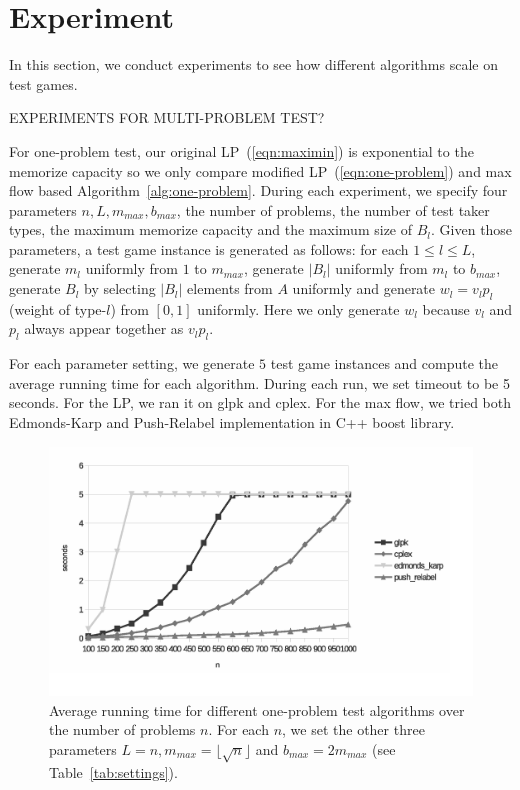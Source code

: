 \documentclass{article}
\begin{document}
\section{Experiment}

In this section, we conduct experiments to see how different algorithms scale
on test games. 

EXPERIMENTS FOR MULTI-PROBLEM TEST?

For one-problem test, our original LP~(\ref{eqn:maximin}) is exponential to the
memorize capacity so we only compare modified LP~(\ref{eqn:one-problem}) and
max flow based Algorithm~\ref{alg:one-problem}.  During each experiment, we
specify four parameters $n, L, m_{max}, b_{max}$, the number of problems, the
number of test taker types, the maximum memorize capacity and the maximum size
of $B_l$. Given those parameters, a test game instance is generated as follows:
for each $1 \leq l \leq L$, generate $m_l$ uniformly from $1$ to $m_{max}$,
generate $|B_l|$ uniformly from $m_l$ to $b_{max}$, generate $B_l$ by selecting
$|B_l|$ elements from $A$ uniformly and generate $w_l = v_l p_l$ (weight of
type-$l$) from $[0,1]$ uniformly. Here we only generate $w_l$ because $v_l$ and
$p_l$ always appear together as $v_l p_l$.

For each parameter setting, we generate $5$ test game instances and compute
the average running time for each algorithm. During each run, we set timeout to
be 5 seconds. For the LP, we ran it on glpk and cplex.  For the max flow, we
tried both Edmonds-Karp and Push-Relabel implementation in C++ boost library.

\begin{figure}
	\caption{Average running time for different one-problem test algorithms
	over the number of problems $n$. For each $n$, we set the other three
	parameters $L = n, m_{max} = \lfloor \sqrt{n} \rfloor$ and $b_{max} =
	2m_{max}$ (see Table~\ref{tab:settings}).}
	\label{fig:benchmark}
	\includegraphics[trim=5mm 0 15mm 0, clip, width=\linewidth]{benchmark}
\end{figure}
\end{document}
